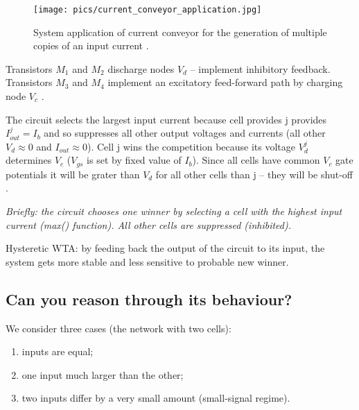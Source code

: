 \documentclass[report]{subfiles}
\begin{document}
\begin{figure}[htbp]
  \centering
  \texttt{[image: pics/current\_conveyor\_application.jpg]}
  \caption{System application of current conveyor for the generation of multiple copies of an input current \cite{book:VLSI}.}
  \label{fig:current_conveyor_application}
\end{figure} 

Transistors $M_1$ and $M_2$ discharge nodes $V_d$ -- implement inhibitory feedback. Transistors $M_3$ and $M_4$
 implement an excitatory feed-forward path by charging node $V_c$ . 
 
 The circuit selects the largest input current because cell provides j provides $I_{out}^j = I_b$  and so suppresses all other output voltages and currents (all other $V_d \approx 0$ and $I_{out} \approx 0$). Cell j wins the competition because its voltage $V_d^j$
determines $V_c$ ($V_{gs}$ is set by fixed value of $I_b$). Since all cells have common $V_c$ gate potentials it will be grater than $V_d$ for all other cells than j -- they will be shut-off \cite{book:VLSI}. 




\textit{Briefly: the circuit chooses one winner by selecting a cell with the highest input current (max() function). All other cells are suppressed (inhibited).}

Hysteretic WTA: by feeding back the output of the circuit to its input, the system gets more stable and less sensitive to probable new winner.

\subsection{Can you reason through its behaviour?}
We consider three cases (the network with two cells): 

\begin{enumerate}[label={I.}]
\item inputs are equal; 
\item one input much larger than the other; 
\item two inputs differ by a very small amount (small-signal regime).
\end{enumerate}
\end{document}
